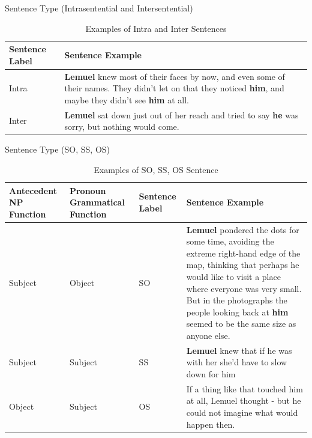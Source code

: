 \documentclass{beamer}
\begin{document}
\begin{frame}{Sentence Type (Intrasentential and Intersentential)}
    \begin{table}[]
        \centering\small
        \begin{tabular}{p{1.5cm} p{7cm}}
        \hline\hline
           Sentence Label & Sentence Example \\\hline
            Intra & \textbf{Lemuel} knew most of their faces by now, and even some of their names. They didn't let on that they noticed \textbf{him}, and maybe they didn't see \textbf{him} at all.\\
            Inter&
            \textbf{Lemuel} sat down just out of her reach and tried to say \textbf{he} was sorry, but nothing would come.
          \\\hline\hline
        \end{tabular}
        \caption{Examples of Intra and Inter Sentences}
        \label{tab:Examples of Intra and Inter Sentences}
    \end{table}
\end{frame}

\begin{frame}{Sentence Type (SO, SS, OS)}
    \begin{table}[]
        \centering\small
        \begin{tabular}{p{1.5cm}p{1.5cm}p{1cm}p{5.5cm}}
        \hline\hline
            Antecedent NP Function & Pronoun Grammatical Function & Sentence Label &Sentence Example \\\hline
            Subject & Object & SO & \textbf{Lemuel} pondered the dots for some time, avoiding the extreme right-hand edge of the map, thinking that perhaps he would like to visit a place where everyone was very small. But in the photographs the people looking back at \textbf{him} seemed to be the same size as anyone else.\\
            Subject&Subject&SS&\textbf{Lemuel} knew that if he was with her she'd have to slow down for him\\
            Object&Subject&OS&If a thing like that touched him at all, Lemuel thought - but he could not imagine what would happen then.\\\hline\hline
        \end{tabular}
        \caption{Examples of SO, SS, OS Sentence}
        \label{tab:Examples of SO, SS, OS Sentences}
    \end{table}
\end{frame}
\end{document}
